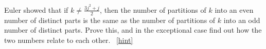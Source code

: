 \documentclass{book}
\begin{document}
\setcounter{project}{315}
\addtocounter{project}{-1}
\begin{activity}[]\label{activity-308}
\hypertarget{p-1596}{}%
Euler showed that if \(k\not= \frac{3j^2+j}{2}\), then the number of partitions of \(k\) into an even number of distinct parts is the same as the number of partitions of \(k\) into an odd number of distinct parts. Prove this, and in the exceptional case find out how the two numbers relate to each other.%
~\hfill{\tiny\hyperlink{a-315}{[hint]}\hypertarget{q-315}{}}\end{activity}
\end{document}
